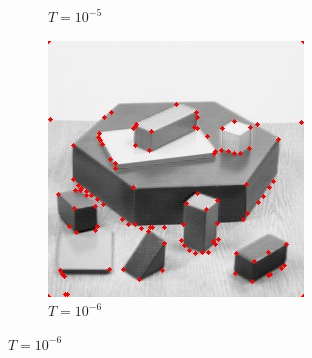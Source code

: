 \documentclass[10pt,a4paper,twoside]{article}
\newcommand{\sweepsize}{0.26}
\begin{document}
\begin{figure}[h]
\begin{subfigure}{\sweepsize\textwidth}
    \caption{$T=10^{-5}$}
    \end{subfigure}
    \begin{subfigure}{\sweepsize\textwidth}
    \includegraphics[width=0.9\linewidth, height=0.9\linewidth]{sweep_blocks/blocks_10_005_1e-06.jpg} 
    \caption{$T=10^{-6}$}
    \end{subfigure}
    

\end{figure}
\end{document}
